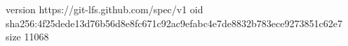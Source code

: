 version https://git-lfs.github.com/spec/v1
oid sha256:4f25dede13d76b56d8e8fc671c92ac9efabc4e7de8832b783ece9273851c62e7
size 11068
